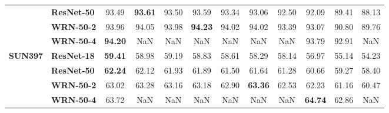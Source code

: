 \begin{table}
\begin{tabular}{l|l|cccccccccc}
       & \textbf{ResNet-50} &             93.49 & \textbf{93.61} & 93.50 & 93.59 & 93.34 & 93.06 & 92.50 & 92.09 & 89.41 & 88.13 \\
       & \textbf{WRN-50-2} &             93.96 & 94.05 & 93.98 & \textbf{94.23} & 94.02 & 94.02 & 93.39 & 93.07 & 90.80 & 89.76 \\
       & \textbf{WRN-50-4} &             \textbf{94.20} &   NaN &   NaN &   NaN &   NaN &   NaN &   NaN & 93.79 & 92.91 &   NaN \\
\cline{1-12}
\multirow{4}{*}{\textbf{SUN397}} & \textbf{ResNet-18} &             \textbf{59.41} & 58.98 & 59.19 & 58.83 & 58.61 & 58.29 & 58.14 & 56.97 & 55.14 & 54.23 \\
       & \textbf{ResNet-50} &             \textbf{62.24} & 62.12 & 61.93 & 61.89 & 61.50 & 61.64 & 61.28 & 60.66 & 59.27 & 58.40 \\
       & \textbf{WRN-50-2} &             63.02 & 63.28 & 63.16 & 63.18 & 62.90 & \textbf{63.36} & 62.53 & 62.23 & 61.16 & 60.47 \\
       & \textbf{WRN-50-4} &             63.72 &   NaN &   NaN &   NaN &   NaN &   NaN &   NaN & \textbf{64.74} & 62.86 &   NaN \\
\bottomrule
\end{tabular}
\end{table}
